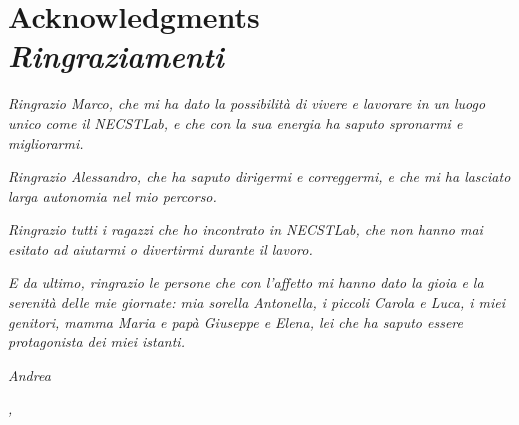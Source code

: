 %
%
\cleardoublepage
%
%
%
\chapter*{Acknowledgments\\\textit{Ringraziamenti}}
%

\textit{
Ringrazio Marco, che mi ha dato la possibilità di vivere e lavorare in un luogo unico come il NECSTLab, e che con la sua energia ha saputo spronarmi e migliorarmi.}

\medskip
\textit{
Ringrazio Alessandro, che ha saputo dirigermi e correggermi, e che mi ha lasciato larga autonomia nel mio percorso.
}

\medskip
\textit{
Ringrazio tutti i ragazzi che ho incontrato in NECSTLab, che non hanno mai esitato ad aiutarmi o divertirmi durante il lavoro.
}

\medskip
\textit{
E da ultimo, ringrazio le persone che con l'affetto mi hanno dato la gioia e la serenità delle mie giornate: mia sorella Antonella, i piccoli Carola e Luca, i miei genitori, mamma Maria e papà Giuseppe e Elena, lei che ha saputo essere protagonista dei miei istanti.}
%

\bigskip

\hfill \textit{Andrea}


\hfill \textit{\myLocation, \myTime}

%
